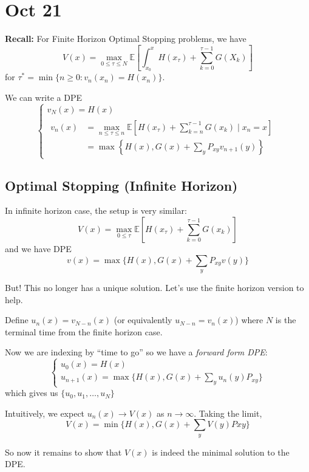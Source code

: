 \documentclass[12pt]{report}
\newcommand{\E}{\mathbb{E}}
\newcommand*{\tbf}[1]{\ifmmode\mathbf{#1}\else\textbf{#1}\fi}
\begin{document}
\section*{Oct 21}
    \tbf{Recall:} For Finite Horizon Optimal Stopping problems, we have 
    \[V(x) = \max_{0 \leq \tau \leq N} \E\left[\int_{x_0}^x H(x_{\tau}) + \sum_{k=0}^{\tau - 1} G(X_k) \right]\] 
    for $\tau^* = \min\{n \geq 0: v_n(x_n) = H(x_n)\}$. 

    We can write a DPE 
    \[\begin{cases}
        v_N(x) = H(x)\\ 
        \begin{aligned}
            v_n(x)&= \max_{n \leq \tau \leq n} \E[H(x_{\tau}) + \sum_{k=n}^{\tau - 1} G(x_k)\; | \; x_n = x]\\ 
            &= \max\left\{H(x), G(x) + \sum_y P_{xy} v_{n+1}(y)\right\}
        \end{aligned}
    \end{cases}\]

\subsection*{Optimal Stopping (Infinite Horizon)} 
    In infinite horizon case, the setup is very similar:
    \[V(x) = \max_{0 \leq \tau} \E\left[H(x_{\tau}) + \sum_{k=0}^{\tau - 1} G(x_k)\right]\]
    and we have DPE 
    \[v(x) = \max\{H(x), G(x) + \sum_y P_{xy} v(y)\} \tag{*}\]

    But! This no longer has a unique solution. Let's use the finite horizon version to help. 

    Define $u_n(x) = v_{N - n}(x)$ (or equivalently $u_{N -n } = v_n(x)$) where $N$ is the terminal time from the finite horizon case. 
    
    Now we are indexing by ``time to go'' so we have a \emph{forward form DPE}:
    \[\begin{cases}
        u_0(x) = H(x)\\ 
        u_{n+1}(x) = \max\{H(x), G(x) + \sum_y u_n(y) P_{xy}\}
    \end{cases}\]
    which gives us $\{u_0, u_1, \dots, u_N\}$ 

    Intuitively, we expect $u_n(x) \to V(x)$ as $n \to \infty$. Taking the limit, 
    \[V(x) = \min\{H(x), G(x) + \sum_y V(y) P{xy}\}\]

    So now it remains to show that $V(x)$ is indeed the minimal solution to the DPE. 
\end{document}
